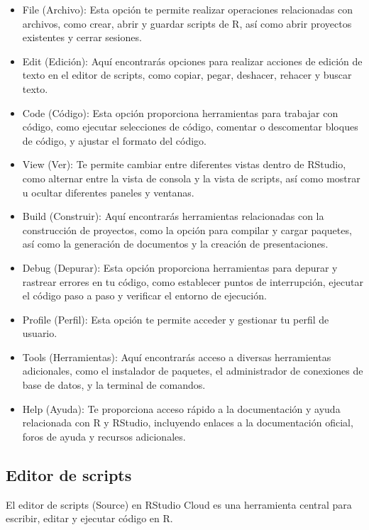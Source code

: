 \documentclass[
]{article}
\begin{document}
\begin{itemize}
\item
  File (Archivo): Esta opción te permite realizar operaciones
  relacionadas con archivos, como crear, abrir y guardar scripts de R,
  así como abrir proyectos existentes y cerrar sesiones.
\item
  Edit (Edición): Aquí encontrarás opciones para realizar acciones de
  edición de texto en el editor de scripts, como copiar, pegar,
  deshacer, rehacer y buscar texto.
\item
  Code (Código): Esta opción proporciona herramientas para trabajar con
  código, como ejecutar selecciones de código, comentar o descomentar
  bloques de código, y ajustar el formato del código.
\item
  View (Ver): Te permite cambiar entre diferentes vistas dentro de
  RStudio, como alternar entre la vista de consola y la vista de
  scripts, así como mostrar u ocultar diferentes paneles y ventanas.
\item
  Build (Construir): Aquí encontrarás herramientas relacionadas con la
  construcción de proyectos, como la opción para compilar y cargar
  paquetes, así como la generación de documentos y la creación de
  presentaciones.
\item
  Debug (Depurar): Esta opción proporciona herramientas para depurar y
  rastrear errores en tu código, como establecer puntos de interrupción,
  ejecutar el código paso a paso y verificar el entorno de ejecución.
\item
  Profile (Perfil): Esta opción te permite acceder y gestionar tu perfil
  de usuario.
\item
  Tools (Herramientas): Aquí encontrarás acceso a diversas herramientas
  adicionales, como el instalador de paquetes, el administrador de
  conexiones de base de datos, y la terminal de comandos.
\item
  Help (Ayuda): Te proporciona acceso rápido a la documentación y ayuda
  relacionada con R y RStudio, incluyendo enlaces a la documentación
  oficial, foros de ayuda y recursos adicionales.
\end{itemize}

\subsection{Editor de scripts}\label{editor-de-scripts}

El editor de scripts (Source) en RStudio Cloud es una herramienta
central para escribir, editar y ejecutar código en R.
\end{document}
